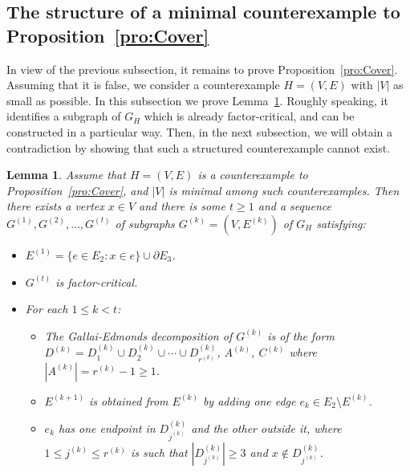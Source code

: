 \documentclass{article}
\newtheorem{lemma}[theorem]{Lemma}
\theoremstyle{definition}
\begin{document}
\subsection{The structure of a minimal counterexample to Proposition~\ref{pro:Cover}}
In view of the previous subsection, it remains to prove Proposition~\ref{pro:Cover}. Assuming that it is false, we consider a counterexample $H = (V, E)$ with $|V|$ as small as possible. In this subsection we prove Lemma~\ref{lem:Cons}. Roughly speaking, it identifies a subgraph of $G_H$ which is already factor-critical, and can be constructed in a particular way. Then, in the next subsection, we will obtain a contradiction by showing that such a structured counterexample cannot exist.
\begin{lemma} \label{lem:Cons}
Assume that $H = (V, E)$ is a counterexample to Proposition~\ref{pro:Cover}, and $|V|$ is minimal among such counterexamples. Then there exists a vertex $x \in V$ and there is some $t \ge 1$ and a sequence $G^{(1)}, G^{(2)}, \ldots , G^{(t)}$ of subgraphs $G^{(k)} = (V, E^{(k)})$ of $G_H$ satisfying:
\begin{itemize}
    \item[(a)] $E^{(1)} = \{e \in E_2: x \in e\} \cup \partial E_3$.
    \item[(b)] $G^{(t)}$ is factor-critical.
    \item[(c)] For each $1 \le k < t$: \begin{itemize}
        \item[(c1)] The Gallai-Edmonds decomposition of $G^{(k)}$ is of the form $D^{(k)} = D_1^{(k)} \cup D_2^{(k)} \cup \cdots \cup D_{r^{(k)}}^{(k)}$, $A^{(k)}$, $C^{(k)}$ where $|A^{(k)}| = r^{(k)} - 1 \ge 1$.
        \item[(c2)] $E^{(k+1)}$ is obtained from $E^{(k)}$ by adding one edge $e_k \in E_2 \setminus E^{(k)}$.
        \item[(c3)] $e_k$ has one endpoint in $D_{j^{(k)}}^{(k)}$ and the other outside it, where $1 \le j^{(k)} \le r^{(k)}$ is such that $|D_{j^{(k)}}^{(k)}| \ge 3$ and $x \notin D_{j^{(k)}}^{(k)}$.
        \end{itemize}
    \end{itemize}
\end{lemma}
\end{document}
